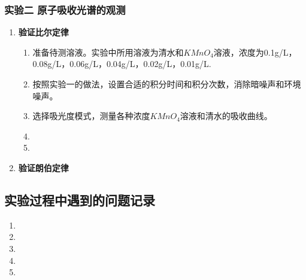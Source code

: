 \documentclass[dvipsnames, svgnames,a4paper,11pt]{article}
\begin{document}
		
		
	

	\subsubsection{实验二 \quad 原子吸收光谱的观测}

		\begin{enumerate}
			\item \textbf{验证比尔定律}
				
				\begin{enumerate}
					\item 准备待测溶液。实验中所用溶液为清水和$KMnO_4$溶液，浓度为0.1g/L，0.08g/L，0.06g/L，0.04g/L，0.02g/L，0.01g/L.
					
					\item 按照实验一的做法，设置合适的积分时间和积分次数，消除暗噪声和环境噪声。
					
					\item 选择吸光度模式，测量各种浓度$KMnO_4$溶液和清水的吸收曲线。
					
					\item 
					
					\item 
				\end{enumerate}
				
				
			\item \textbf{验证朗伯定律}
			
			
			
		\end{enumerate}


	
	








\subsection{实验过程中遇到的问题记录}

\begin{enumerate}
	\item 	
	
	\item 	
	
	\item 	
	
	\item 	
	
	\item 	
	
\end{enumerate}
	
\end{document}
